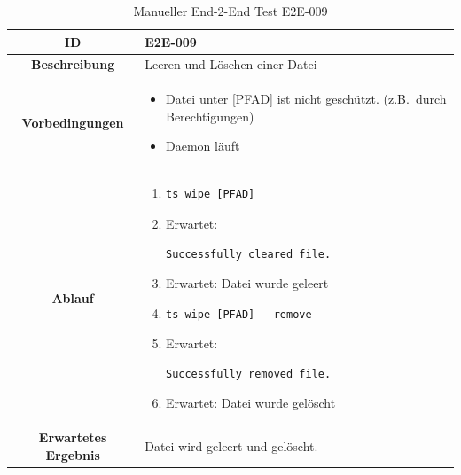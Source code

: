 \documentclass[a4paper,12pt]{report}
\begin{document}
    \begin{table}[h!]
        \centering
        \setlength{\leftmargini}{0.8cm}
        \begin{tabular}{|c|p{10cm}|}
            \hline
            \textbf{ID}                  & E2E-009                          \\ \hline
            \textbf{Beschreibung}        & Leeren und Löschen einer Datei   \\ \hline
            \textbf{Vorbedingungen} &
            \begin{itemize}
                \item Datei unter [PFAD] ist nicht geschützt. (z.B.\ durch Berechtigungen)
                \item Daemon läuft
            \end{itemize} \\ \hline
            \textbf{Ablauf} &
            \begin{enumerate}
                \item \begin{verbatim}ts wipe [PFAD]
                \end{verbatim}
                \item Erwartet: \begin{verbatim}Successfully cleared file.
                \end{verbatim}
                \item Erwartet: Datei wurde geleert
                \item \begin{verbatim}ts wipe [PFAD] --remove
                \end{verbatim}
                \item Erwartet: \begin{verbatim}Successfully removed file.
                \end{verbatim}
                \item Erwartet: Datei wurde gelöscht
            \end{enumerate} \\ \hline
            \textbf{Erwartetes Ergebnis} & Datei wird geleert und gelöscht. \\ \hline
        \end{tabular}
        \caption{Manueller End-2-End Test E2E-009}\label{tab:e2e-9}
    \end{table}

    \clearpage
\end{document}
